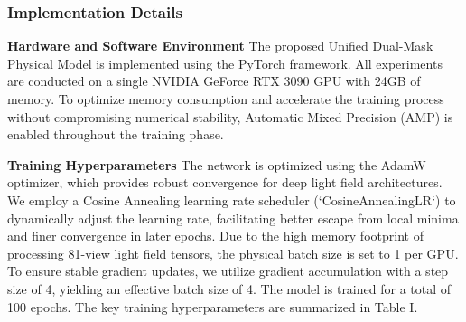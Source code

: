 \documentclass[lettersize,journal]{IEEEtran}
\begin{document}
\subsubsection{Implementation Details}

\textbf{Hardware and Software Environment}  
The proposed Unified Dual-Mask Physical Model is implemented using the PyTorch framework. All experiments are conducted on a single NVIDIA GeForce RTX 3090 GPU with 24GB of memory. To optimize memory consumption and accelerate the training process without compromising numerical stability, Automatic Mixed Precision (AMP) is enabled throughout the training phase. 

\textbf{Training Hyperparameters}  
The network is optimized using the AdamW optimizer, which provides robust convergence for deep light field architectures. We employ a Cosine Annealing learning rate scheduler (`CosineAnnealingLR`) to dynamically adjust the learning rate, facilitating better escape from local minima and finer convergence in later epochs. Due to the high memory footprint of processing 81-view light field tensors, the physical batch size is set to 1 per GPU. To ensure stable gradient updates, we utilize gradient accumulation with a step size of 4, yielding an effective batch size of 4. The model is trained for a total of 100 epochs. The key training hyperparameters are summarized in Table I.
\end{document}
